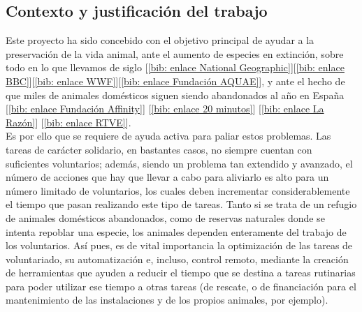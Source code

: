 \documentclass[12pt]{article}
\begin{document}
	
	\subsection[Contexto y justificación del trabajo]{Contexto y justificación del trabajo}

	\noindent Este proyecto ha sido concebido con el objetivo principal de ayudar a la preservación de la vida animal, ante el aumento de especies en extinción, sobre todo en lo que llevamos de siglo [\ref{bib: enlace National Geographic}][\ref{bib: enlace BBC}][\ref{bib: enlace WWF}][\ref{bib: enlace Fundación AQUAE}], %
	y ante el hecho de que miles de animales domésticos siguen siendo abandonados al año en España [\ref{bib: enlace Fundación Affinity}] [\ref{bib: enlace 20 minutos}] [\ref{bib: enlace La Razón}] [\ref{bib: enlace RTVE}]. \\ %
	

	\noindent Es por ello que se requiere de ayuda activa para paliar estos problemas. Las tareas de carácter solidario, en bastantes casos, no siempre cuentan con suficientes voluntarios; además, siendo un problema tan extendido y avanzado, el número de acciones que hay que llevar a cabo para aliviarlo es alto para un número limitado de voluntarios, los cuales deben incrementar considerablemente el tiempo que pasan realizando este tipo de tareas. 
	Tanto si se trata de un refugio de animales domésticos abandonados, como de reservas naturales donde se intenta repoblar una especie, los animales dependen enteramente del trabajo de los voluntarios. Así pues, es de vital importancia la optimización de las tareas de voluntariado, su automatización e, incluso, control remoto, mediante la creación de herramientas que ayuden a reducir el tiempo que se destina a tareas rutinarias para poder utilizar ese tiempo a otras tareas (de rescate, o de financiación para el mantenimiento de las instalaciones y de los propios animales, por ejemplo). \\
	
\end{document}
